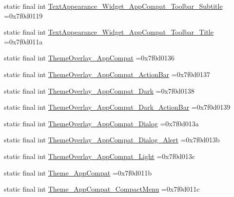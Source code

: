 \begin{DoxyCompactItemize}
\item 
static final int \mbox{\hyperlink{classbr_1_1unb_1_1cic_1_1mp_1_1marketmaster_1_1R_1_1style_af79c47dcaad75aed17d0f220cc3e6add}{Text\+Appearance\+\_\+\+Widget\+\_\+\+App\+Compat\+\_\+\+Toolbar\+\_\+\+Subtitle}} =0x7f0d0119
\item 
static final int \mbox{\hyperlink{classbr_1_1unb_1_1cic_1_1mp_1_1marketmaster_1_1R_1_1style_afe8ffa6584096df42c6daa083116e03c}{Text\+Appearance\+\_\+\+Widget\+\_\+\+App\+Compat\+\_\+\+Toolbar\+\_\+\+Title}} =0x7f0d011a
\item 
static final int \mbox{\hyperlink{classbr_1_1unb_1_1cic_1_1mp_1_1marketmaster_1_1R_1_1style_a9884c6eead358ad15751c9d866925e16}{Theme\+Overlay\+\_\+\+App\+Compat}} =0x7f0d0136
\item 
static final int \mbox{\hyperlink{classbr_1_1unb_1_1cic_1_1mp_1_1marketmaster_1_1R_1_1style_a384001cba0ef2b6b4bf125625f6abd16}{Theme\+Overlay\+\_\+\+App\+Compat\+\_\+\+Action\+Bar}} =0x7f0d0137
\item 
static final int \mbox{\hyperlink{classbr_1_1unb_1_1cic_1_1mp_1_1marketmaster_1_1R_1_1style_a0d5aa99b304550dd54c1d16873c6d0e5}{Theme\+Overlay\+\_\+\+App\+Compat\+\_\+\+Dark}} =0x7f0d0138
\item 
static final int \mbox{\hyperlink{classbr_1_1unb_1_1cic_1_1mp_1_1marketmaster_1_1R_1_1style_aa13e629ade8aa3ed4bb9257348f6d64a}{Theme\+Overlay\+\_\+\+App\+Compat\+\_\+\+Dark\+\_\+\+Action\+Bar}} =0x7f0d0139
\item 
static final int \mbox{\hyperlink{classbr_1_1unb_1_1cic_1_1mp_1_1marketmaster_1_1R_1_1style_a4306558973322ac01640f86b4804e448}{Theme\+Overlay\+\_\+\+App\+Compat\+\_\+\+Dialog}} =0x7f0d013a
\item 
static final int \mbox{\hyperlink{classbr_1_1unb_1_1cic_1_1mp_1_1marketmaster_1_1R_1_1style_a5efca54fa0b6a6917b90220f4d607ee0}{Theme\+Overlay\+\_\+\+App\+Compat\+\_\+\+Dialog\+\_\+\+Alert}} =0x7f0d013b
\item 
static final int \mbox{\hyperlink{classbr_1_1unb_1_1cic_1_1mp_1_1marketmaster_1_1R_1_1style_a38b7319292dc4abd3a0bc17d5e586162}{Theme\+Overlay\+\_\+\+App\+Compat\+\_\+\+Light}} =0x7f0d013c
\item 
static final int \mbox{\hyperlink{classbr_1_1unb_1_1cic_1_1mp_1_1marketmaster_1_1R_1_1style_ac197be17690776df56d088619de85310}{Theme\+\_\+\+App\+Compat}} =0x7f0d011b
\item 
static final int \mbox{\hyperlink{classbr_1_1unb_1_1cic_1_1mp_1_1marketmaster_1_1R_1_1style_aaced58eab86c7652462c13e9c79d724e}{Theme\+\_\+\+App\+Compat\+\_\+\+Compact\+Menu}} =0x7f0d011c

\end{DoxyCompactItemize}
